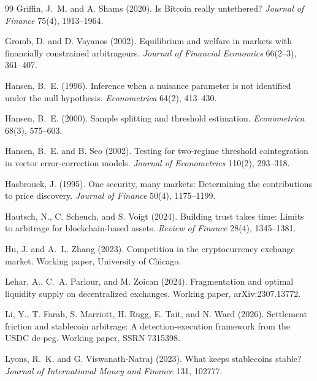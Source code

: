 \documentclass[12pt]{article}
\theoremstyle{definition}
\theoremstyle{remark}
\begin{document}
\begin{thebibliography}{99}
Griffin, J.~M. and A. Shams (2020). Is Bitcoin really untethered? \emph{Journal of Finance} 75(4), 1913--1964.

Gromb, D. and D. Vayanos (2002). Equilibrium and welfare in markets with financially constrained arbitrageurs. \emph{Journal of Financial Economics} 66(2--3), 361--407.

Hansen, B.~E. (1996). Inference when a nuisance parameter is not identified under the null hypothesis. \emph{Econometrica} 64(2), 413--430.

Hansen, B.~E. (2000). Sample splitting and threshold estimation. \emph{Econometrica} 68(3), 575--603.

Hansen, B.~E. and B. Seo (2002). Testing for two-regime threshold cointegration in vector error-correction models. \emph{Journal of Econometrics} 110(2), 293--318.

Hasbrouck, J. (1995). One security, many markets: Determining the contributions to price discovery. \emph{Journal of Finance} 50(4), 1175--1199.

Hautsch, N., C. Scheuch, and S. Voigt (2024). Building trust takes time: Limits to arbitrage for blockchain-based assets. \emph{Review of Finance} 28(4), 1345--1381.

Hu, J. and A.~L. Zhang (2023). Competition in the cryptocurrency exchange market. Working paper, University of Chicago.

Lehar, A., C.~A. Parlour, and M. Zoican (2024). Fragmentation and optimal liquidity supply on decentralized exchanges. Working paper, arXiv:2307.13772.

Li, Y., T. Farah, S. Marriott, H. Rugg, E. Tait, and N. Ward (2026). Settlement friction and stablecoin arbitrage: A detection-execution framework from the USDC de-peg. Working paper, SSRN 7315398.

Lyons, R.~K. and G. Viswanath-Natraj (2023). What keeps stablecoins stable? \emph{Journal of International Money and Finance} 131, 102777.


\end{thebibliography}
\end{document}
